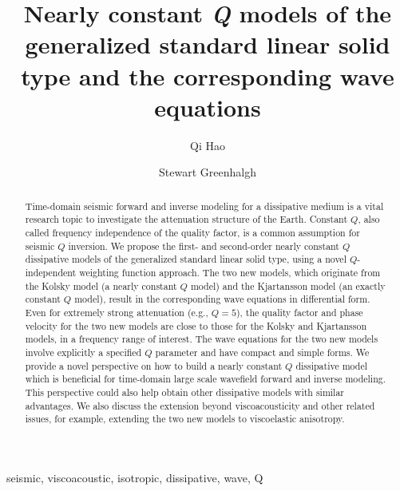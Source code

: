 \documentclass[article]{./macros/elsarticle_qh}
\begin{document}
	
\begin{frontmatter}
		
\title{{\Large \textbf{Nearly constant \textit{Q} models of the generalized standard linear solid type and the corresponding wave equations}}
}


\address[KFUPM]{CPG, KFUPM, Dhahran, 31261, Saudi Arabia}
\address[ETHZ]{Institute of Geophysics, ETH Zurich, Zurich, 8092, Switzerland}

\author[KFUPM]{Qi Hao} 

\author[ETHZ]{Stewart Greenhalgh}


\begin{abstract}
Time-domain seismic forward and inverse modeling for a dissipative medium is a vital research topic to investigate the attenuation structure of the Earth. 
Constant $Q$, also called frequency independence of the quality factor, is a common assumption for seismic $Q$ inversion. We propose the first- and second-order nearly constant $Q$ dissipative models of the generalized standard linear solid type, using a novel $Q$-independent weighting function approach. The two new models, which originate from the Kolsky model (a nearly constant $Q$ model) and the Kjartansson model (an exactly constant $Q$ model), result in the corresponding wave equations in differential form. Even for extremely strong attenuation (e.g., $Q=5$), the quality factor  and phase velocity for the two new models are close to those for the Kolsky and Kjartansson models, in a frequency range of interest. The wave equations for the two new models involve explicitly a specified $Q$ parameter and have compact and simple forms. We provide a novel perspective on how to build a nearly constant $Q$ dissipative model which is beneficial for time-domain large scale wavefield forward and inverse modeling. This perspective could also help obtain other dissipative models with similar advantages. We also discuss the extension beyond viscoacousticity and other related issues, for example, extending the two new models to viscoelastic anisotropy.
\end{abstract}

\begin{keyword}
seismic, viscoacoustic, isotropic, dissipative, wave, Q
\end{keyword}

\end{frontmatter}
\end{document}
